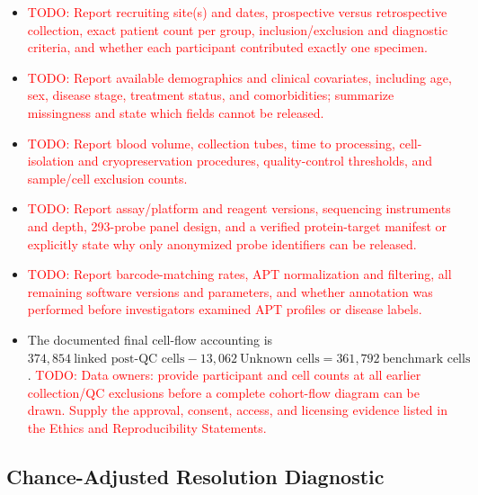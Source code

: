 \documentclass{article} %
\newcommand{\todo}[1]{\textcolor{red}{TODO: #1}}
\begin{document}
\begin{itemize}
    \item \todo{Report recruiting site(s) and dates, prospective versus retrospective
    collection, exact patient count per group, inclusion/exclusion and diagnostic
    criteria, and whether each participant contributed exactly one specimen.}
    \item \todo{Report available demographics and clinical covariates, including age,
    sex, disease stage, treatment status, and comorbidities; summarize missingness and
    state which fields cannot be released.}
    \item \todo{Report blood volume, collection tubes, time to processing, cell-isolation
    and cryopreservation procedures, quality-control thresholds, and sample/cell
    exclusion counts.}
    \item \todo{Report assay/platform and reagent versions, sequencing instruments and
    depth, 293-probe panel design, and a verified protein-target manifest or explicitly
    state why only anonymized probe identifiers can be released.}
    \item \todo{Report barcode-matching rates, APT normalization and filtering,
    all remaining software versions and parameters, and whether annotation was
    performed before investigators examined APT profiles or disease labels.}
    \item The documented final cell-flow accounting is
    $374{,}854\ \text{linked post-QC cells}
    -13{,}062\ \text{Unknown cells}=361{,}792\ \text{benchmark cells}$.
    \todo{Data owners: provide participant and cell counts at all earlier
    collection/QC exclusions before a complete cohort-flow diagram can be
    drawn. Supply the approval, consent, access, and licensing evidence listed
    in the Ethics and Reproducibility Statements.}
\end{itemize}

\subsection{Chance-Adjusted Resolution Diagnostic}
\label{sec:appendix:granularity_chance}
\end{document}

